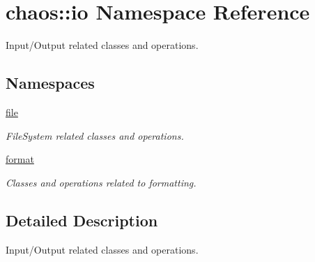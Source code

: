 \hypertarget{namespacechaos_1_1io}{\section{chaos\-:\-:io Namespace Reference}
\label{namespacechaos_1_1io}
}


Input/\-Output related classes and operations.  


\subsection*{Namespaces}
\begin{DoxyCompactItemize}
\item 
\hyperlink{namespacechaos_1_1io_1_1file}{file}
\begin{DoxyCompactList}\small\item\em File\-System related classes and operations. \end{DoxyCompactList}\item 
\hyperlink{namespacechaos_1_1io_1_1format}{format}
\begin{DoxyCompactList}\small\item\em Classes and operations related to formatting. \end{DoxyCompactList}\end{DoxyCompactItemize}


\subsection{Detailed Description}
Input/\-Output related classes and operations. 